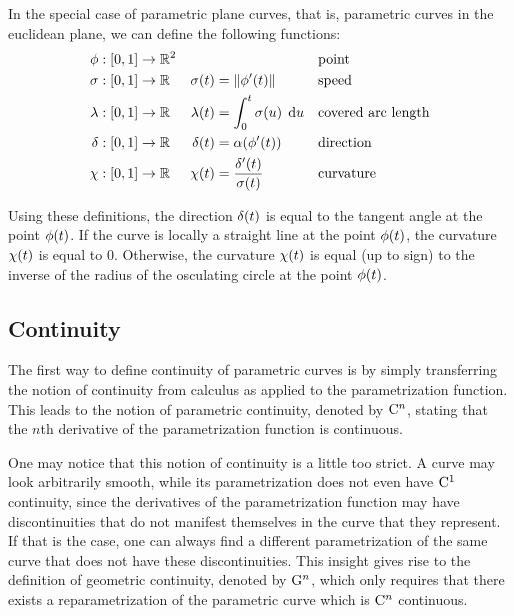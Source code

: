 \documentclass[a4paper]{article}
\begin{document}
			In the special case of parametric plane curves, that is, parametric curves in the euclidean plane, we can define the following functions:
			\begin{align*}
				\phi    & : \function{\unit}{\R{2}} &                    &                                                && \text{point}\\
				\sigma  & : \function{\unit}{\RR}   & \apply{\sigma}{t}  & = \xn{\apply{\phi'}{t}}                        && \text{speed}\\
				\lambda & : \function{\unit}{\RR}   & \apply{\lambda}{t} & = \integral{0}{t}{\apply{\sigma}{u}}{u}        && \text{covered arc length}\\
				\delta  & : \function{\unit}{\RR}   & \apply{\delta}{t}  & = \apply{\alpha}{\apply{\phi'}{t}}             && \text{direction}\\
				\chi    & : \function{\unit}{\RR}   & \apply{\chi}{t}    & = \frac{\apply{\delta'}{t}}{\apply{\sigma}{t}} && \text{curvature}
			\end{align*}

			Using these definitions, the direction \(\delta\!\left( t \right)\) is equal to the tangent angle at the point \(\phi\!\left( t \right)\). If the curve is locally a straight line at the point \(\phi\!\left( t \right)\), the curvature \(\chi\!\left( t \right)\) is equal to \(0\). Otherwise, the curvature \(\chi\!\left( t \right)\) is equal (up to sign) to the inverse of the radius of the osculating circle at the point \(\phi\!\left( t \right)\).

		\subsection{Continuity}
		\label{section:continuity}

			The first way to define continuity of parametric curves is by simply transferring the notion of continuity from calculus as applied to the parametrization function. This leads to the notion of parametric continuity, denoted by \(\mathrm{C}^{n}\), stating that the \(n\)th derivative of the parametrization function is continuous.

			One may notice that this notion of continuity is a little too strict. A curve may look arbitrarily smooth, while its parametrization does not even have \(\mathrm{C}^{1}\) continuity, since the derivatives of the parametrization function may have discontinuities that do not manifest themselves in the curve that they represent. If that is the case, one can always find a different parametrization of the same curve that does not have these discontinuities. This insight gives rise to the definition of geometric continuity, denoted by \(\mathrm{G}^{n}\), which only requires that there exists a reparametrization of the parametric curve which is \(\mathrm{C}^{n}\) continuous.
\end{document}
